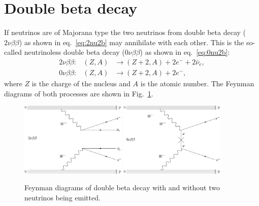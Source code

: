 \section{Double beta decay}
\label{sec:0n2b}
If neutrinos are of Majorana type the two neutrinos from double beta
decay ($2\nu\beta\beta$) as shown in eq.~\ref{eq:2nu2b} may annihilate
with each other. This is the so-called neutrinoless double beta decay
($0\nu\beta\beta$) as shown in eq.~\ref{eq:0nu2b}:
\begin{eqnarray}
  2\nu\beta\beta: &(Z,A)& \rightarrow (Z+2,A) + 2e^{-} +
2\bar{\nu}_{e}, \\\label{eq:2nu2b}
  0\nu\beta\beta: &(Z,A)& \rightarrow (Z+2,A) + 2e^{-},
\label{eq:0nu2b}
\end{eqnarray}
where $Z$ is the charge of the nucleus and $A$ is the atomic number.
The Feynman diagrams of both processes are shown in
Fig.~\ref{fig:2bdecay}.
\begin{figure}[tbhp]
  \centering
  \includegraphics[width=0.45\textwidth]{FD2nu2b.eps} \hfil
  \includegraphics[width=0.45\textwidth]{FD0nu2b.eps}  
  \caption{Feynman diagrams of double beta decay with and without two neutrinos being emitted.}
  \label{fig:2bdecay}
\end{figure}

